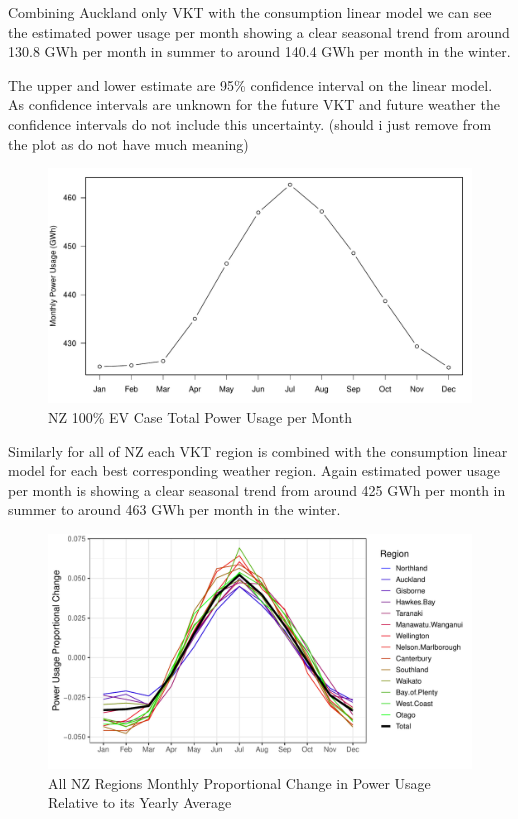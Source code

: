 \documentclass[
]{article}
\begin{document}
Combining Auckland only VKT with the consumption linear model we can see
the estimated power usage per month showing a clear seasonal trend from
around 130.8 GWh per month in summer to around 140.4 GWh per month in
the winter.

The upper and lower estimate are 95\% confidence interval on the linear
model. As confidence intervals are unknown for the future VKT and future
weather the confidence intervals do not include this uncertainty.
(should i just remove from the plot as do not have much meaning)

\begin{figure}
\centering
\includegraphics{summary_week4_files/figure-latex/NZ_power-1.pdf}
\caption{NZ 100\% EV Case Total Power Usage per Month}
\end{figure}

Similarly for all of NZ each VKT region is combined with the consumption
linear model for each best corresponding weather region. Again estimated
power usage per month is showing a clear seasonal trend from around 425
GWh per month in summer to around 463 GWh per month in the winter.

\begin{figure}
\centering
\includegraphics{summary_week4_files/figure-latex/NZ_region_power_prop-1.pdf}
\caption{All NZ Regions Monthly Proportional Change in Power Usage
Relative to its Yearly Average}
\end{figure}
\end{document}
